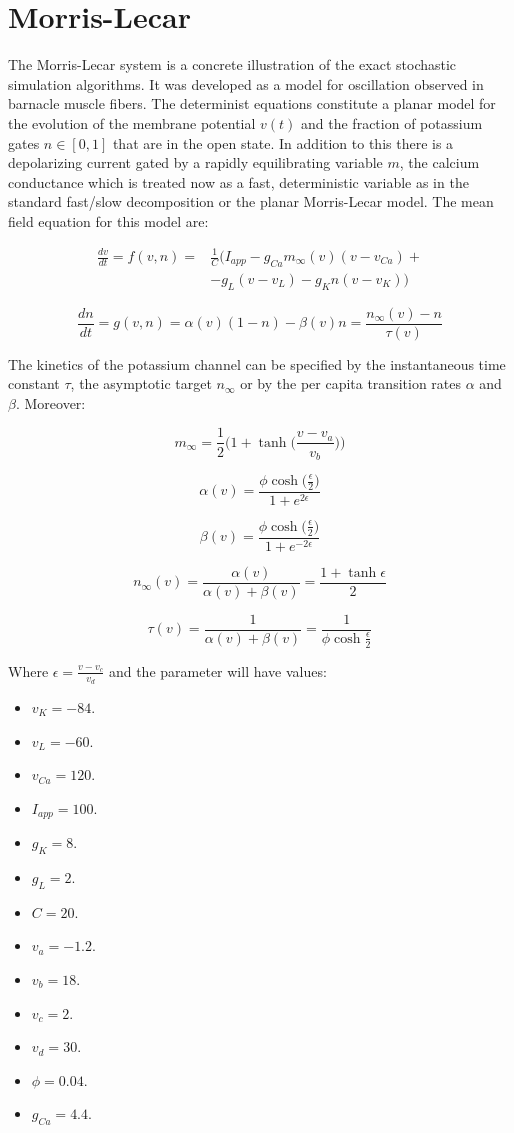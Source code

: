 \section{Morris-Lecar}
The Morris-Lecar system is a concrete illustration of the exact stochastic simulation algorithms.
It was developed as a model for oscillation observed in barnacle muscle fibers.
The determinist equations constitute a planar model for the evolution of the membrane potential $v(t)$ and the fraction of potassium gates $n\in[0,1]$ that are in the open state.
In addition to this there is a depolarizing current gated by a rapidly equilibrating variable $m$, the calcium conductance which is treated now as a fast, deterministic variable as in the standard fast/slow decomposition or the planar Morris-Lecar model.
The mean field equation for this model are:

\begin{align*}
	\frac{dv}{dt} = f(v, n) =& \frac{1}{C}(I_{app}-g_{Ca}m_{\infty}(v)(v-v_{Ca})+\\
													 &-g_L(v-v_L)-g_Kn(v-v_K))
\end{align*}

$$\frac{dn}{dt} = g(v, n) = \alpha(v)(1-n)-\beta(v)n = \frac{n_{\infty}(v)-n}{\tau(v)}$$

The kinetics of the potassium channel can be specified by the instantaneous time constant $\tau$, the asymptotic target $n_{\infty}$ or by the per capita transition rates $\alpha$ and $\beta$.
Moreover:

$$m_{\infty} = \frac{1}{2}\biggl(1+\tanh\biggl(\frac{v-v_a}{v_b}\biggr)\biggr)$$

$$\alpha(v) = \frac{\phi\cosh\bigl(\frac{\epsilon}{2}\bigr)}{1+e^{2\epsilon}}$$

$$\beta(v) = \frac{\phi\cosh\bigl(\frac{\epsilon}{2}\bigr)}{1+e^{-2\epsilon}}$$

$$n_\infty(v) = \frac{\alpha(v)}{\alpha(v)+\beta(v)} = \frac{1+\tanh\epsilon}{2}$$

$$\tau(v) = \frac{1}{\alpha(v)+\beta(v)} = \frac{1}{\phi\cosh\frac{\epsilon}{2}}$$

Where $\epsilon = \frac{v-v_c}{v_d}$ and the parameter will have values:

\begin{multicols}{3}
	\begin{itemize}
		\item $v_K = -84$.
		\item $v_L = -60$.
		\item $v_{Ca} = 120$.
		\item $I_{app} = 100$.
		\item $g_K = 8$.
		\item $g_L = 2$.
		\item $C = 20$.
		\item $v_a = -1.2$.
		\item $v_b = 18$.
		\item $v_c = 2$.
		\item $v_d = 30$.
		\item $\phi = 0.04$.
		\item $g_{Ca} = 4.4$.
	\end{itemize}
\end{multicols}

